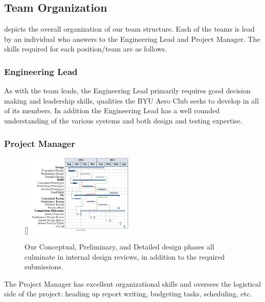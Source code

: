 \subsection{Team Organization}
\label{ssec:TeamOrganization}



 depicts the overall organization of our team structure.  Each of the teams is lead by an individual who answers to the Engineering Lead and Project Manager.  The skills required for each position/team are as follows.




\subsubsection{Engineering Lead} As with the team leads, the Engineering Lead primarily requires good decision making and leadership skills, qualities the BYU Aero Club seeks to develop in all of its members.
In addition the Engineering Lead has a well rounded understanding of the various systems and both design and testing expertise.


\subsubsection{Project Manager}\begin{figure}
		\raisebox{0pt}[\dimexpr{}\baselineskip\relax]{
	\includegraphics[width=0.45\textwidth]{ganttchart.pdf}}
	\caption{Our {\color{\BYUblue} Conceptual}, {\color{\BYUred} Preliminary}, and {\color{\BYUgreen} Detailed} design phases all culminate in internal design reviews, in addition to the required submissions.}
	\label{fig:plannedtiming}
\end{figure} The Project Manager has excellent organizational skills
and oversees the logistical side of the project: heading up report writing, budgeting tasks, scheduling, etc.
